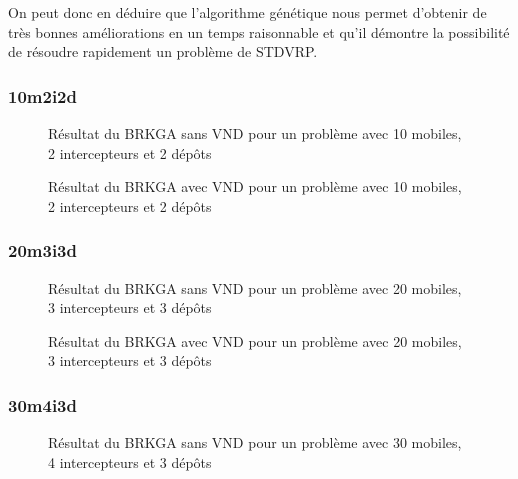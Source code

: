             On peut donc en déduire que l'algorithme génétique nous permet d'obtenir de très bonnes améliorations en un temps raisonnable et qu'il démontre la possibilité de résoudre rapidement un problème de STDVRP.
            
            \subsubsection{10m2i2d}
                
                \begin{figure}[H]
                	
                \caption{Résultat du BRKGA sans VND pour un problème avec 10 mobiles, 2 intercepteurs et 2 dépôts}
				\label{fig:10m2i2d-sansvnd}
				\end{figure}
                
                \begin{figure}[h!]
                	
                \caption{Résultat du BRKGA avec VND pour un problème avec 10 mobiles, 2 intercepteurs et 2 dépôts}
				\label{fig:10m2i2d-avecvnd}
				\end{figure}
				
            \subsubsection{20m3i3d}
                \begin{figure}[h!]
                	
                \caption{Résultat du BRKGA sans VND pour un problème avec 20 mobiles, 3 intercepteurs et 3 dépôts}
				\label{fig:20m3i3d-sansvnd}
				\end{figure}
                
                \begin{figure}[H]
                	
                \caption{Résultat du BRKGA avec VND pour un problème avec 20 mobiles, 3 intercepteurs et 3 dépôts}
				\label{fig:20m3i3d-avecvnd}
				\end{figure}
				
            \subsubsection{30m4i3d}
           		\begin{figure}[h!]
                	
                \caption{Résultat du BRKGA sans VND pour un problème avec 30 mobiles, 4 intercepteurs et 3 dépôts}
				\label{fig:30m4i3d-sansvnd}
                \end{figure}
                
